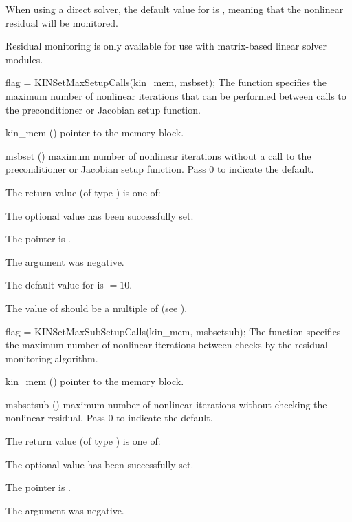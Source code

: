 {
  When using a direct solver, the default value for  is ,
  meaning that the nonlinear residual will be monitored.

  {\warn}Residual monitoring is only available for use with
  matrix-based linear solver modules.
}
{
flag = KINSetMaxSetupCalls(kin\_mem, msbset);
}
{
  The function  specifies the maximum number of
  nonlinear iterations that can be performed between calls to the
  preconditioner or Jacobian setup function.
}
{
  \begin{args}
  \item[kin\_mem] ()
    pointer to the {\kinsol} memory block.
  \item[msbset] ()
    maximum number of nonlinear iterations without a call to the
    preconditioner or Jacobian setup function.  Pass 0 to indicate the default.
  \end{args}
}
{
  The return value  (of type ) is one of:
  \begin{args}
  \item[\Id{KIN\_SUCCESS}]
    The optional value has been successfully set.
  \item[\Id{KIN\_MEM\_NULL}]
    The  pointer is .
  \item[\Id{KIN\_ILL\_INPUT}]
    The argument  was negative.
  \end{args}
}
{
  The default value for  is  $=10$.

  The value of  should be a multiple of  (see
  ).
}
{
flag = KINSetMaxSubSetupCalls(kin\_mem, msbsetsub);
}
{
  The function  specifies the maximum number of
  nonlinear iterations between checks by the residual monitoring algorithm.
}
{
  \begin{args}
  \item[kin\_mem] ()
    pointer to the {\kinsol} memory block.
  \item[msbsetsub] ()
    maximum number of nonlinear iterations without checking the
    nonlinear residual. Pass 0 to indicate the default.
  \end{args}
}
{
  The return value  (of type ) is one of:
  \begin{args}
  \item[\Id{KIN\_SUCCESS}]
    The optional value has been successfully set.
  \item[\Id{KIN\_MEM\_NULL}]
    The  pointer is .
  \item[\Id{KIN\_ILL\_INPUT}]
    The argument  was negative.
  \end{args}
}
